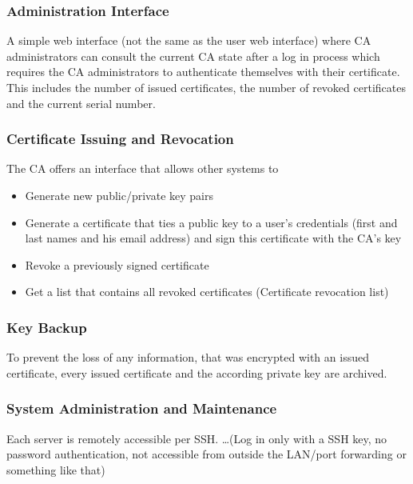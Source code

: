 \documentclass{article}
\begin{document}
\subsubsection{Administration Interface}

A simple web interface (not the same as the user web interface) where CA administrators can consult the current CA state after a log in process which requires the CA administrators to authenticate themselves with their certificate. This includes the number of issued certificates, the number of revoked certificates and the current serial number.

\subsubsection{Certificate Issuing and Revocation}

The CA offers an interface that allows other systems to

\begin{itemize}

\item Generate new public/private key pairs

\item Generate a certificate that ties a public key to a user's credentials (first and last names and his email address) and sign this certificate with the CA's key

\item Revoke a previously signed certificate

\item Get a list that contains all revoked certificates (Certificate revocation list)

\end{itemize}

\subsubsection{Key Backup}

To prevent the loss of any information, that was encrypted with an issued certificate, every issued certificate and the according private key are archived.

\subsubsection{System Administration and Maintenance}

Each server is remotely accessible per SSH. \dots (Log in only with a SSH key, no password authentication, not accessible from outside the LAN/port forwarding or something like that)
\end{document}
